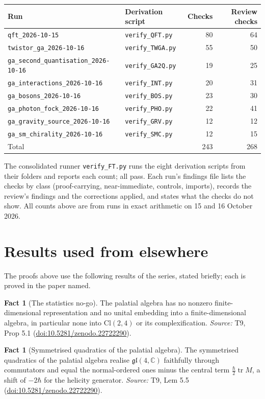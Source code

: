 \documentclass[11pt]{article}
\theoremstyle{definition}
\newtheorem{fact}[theorem]{Fact}
\theoremstyle{plain}
\providecommand{\C}{}\renewcommand{\C}{\mathbb{C}}
\providecommand{\Cl}{}\renewcommand{\Cl}{\mathrm{Cl}}
\begin{document}
\begin{tabularx}{\textwidth}{@{}lXrr@{}}
\toprule
Run & Derivation script & Checks & Review checks\\
\midrule
\texttt{qft\_2026-10-15} & \texttt{verify\_QFT.py} & 80 & 64\\
\texttt{twistor\_ga\_2026-10-16} & \texttt{verify\_TWGA.py} & 55 & 50\\
\texttt{ga\_second\_quantisation\_2026-10-16} & \texttt{verify\_GA2Q.py} & 19 & 25\\
\texttt{ga\_interactions\_2026-10-16} & \texttt{verify\_INT.py} & 20 & 31\\
\texttt{ga\_bosons\_2026-10-16} & \texttt{verify\_BOS.py} & 23 & 30\\
\texttt{ga\_photon\_fock\_2026-10-16} & \texttt{verify\_PHO.py} & 22 & 41\\
\texttt{ga\_gravity\_source\_2026-10-16} & \texttt{verify\_GRV.py} & 12 & 12\\
\texttt{ga\_sm\_chirality\_2026-10-16} & \texttt{verify\_SMC.py} & 12 & 15\\
\midrule
Total & & 243 & 268\\
\bottomrule
\end{tabularx}

The consolidated runner \texttt{verify\_FT.py} runs the eight derivation scripts from their folders and reports each count; all pass. Each run's findings file lists the checks by class (proof-carrying, near-immediate, controls, imports), records the review's findings and the corrections applied, and states what the checks do not show. All counts above are from runs in exact arithmetic on 15 and 16 October 2026.

\section{Results used from elsewhere}
The proofs above use the following results of the series, stated briefly; each is proved in the paper named.

\begin{fact}[The statistics no-go]\label{c:correspondence.statistics-no-go}
The palatial algebra has no nonzero finite-dimensional representation and no unital embedding into a finite-dimensional algebra, in particular none into $\Cl(2,4)$ or its complexification.
\emph{Source:} T9, Prop 5.1 (\href{https://doi.org/10.5281/zenodo.22722290}{doi:10.5281/zenodo.22722290}).
\end{fact}

\begin{fact}[Symmetrised quadratics of the palatial algebra]\label{c:correspondence.symmetrised-quadratics-palatial-algebra}
The symmetrised quadratics of the palatial algebra realise $\mathfrak{gl}(4,\C)$ faithfully through commutators and equal the normal-ordered ones minus the central term $\tfrac{\hbar}{2}\operatorname{tr}M$, a shift of $-2\hbar$ for the helicity generator.
\emph{Source:} T9, Lem 5.5 (\href{https://doi.org/10.5281/zenodo.22722290}{doi:10.5281/zenodo.22722290}).
\end{fact}
\end{document}
